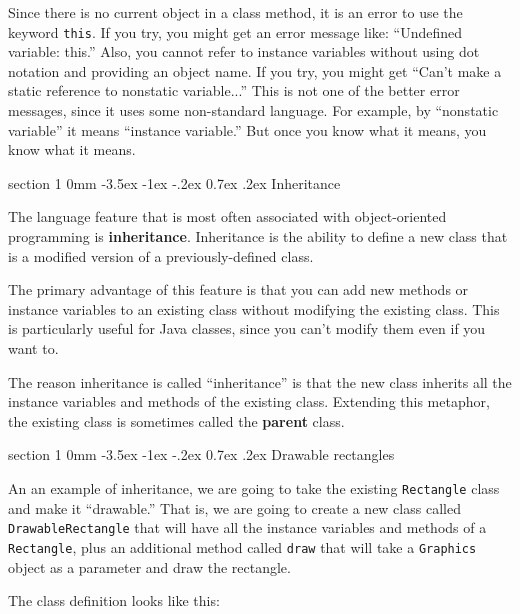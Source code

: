 \documentclass{book}
\makeatletter
\renewcommand{\section}{\@startsection 
    {section} {1} {0mm}%
    {-3.5ex \@plus -1ex \@minus -.2ex}%
    {0.7ex \@plus.2ex}%
    {\normalfont\Large\bfseries}}
\makeatother
\begin{document}

Since there is no current object in a class method, it is an
error to use the keyword {\tt this}.  If you try, you might get
an error message like: ``Undefined variable: this.''  Also, you
cannot refer to instance variables without using dot notation
and providing an object name.  If you try, you might get 
``Can't make a static reference to nonstatic variable...''
This is not one of the better error messages, since it uses
some non-standard language.  For example, by ``nonstatic
variable'' it means ``instance variable.''  But once you know
what it means, you know what it means.


\section{Inheritance}

The language feature that is most often associated with
object-oriented programming is {\bf inheritance}.  Inheritance is the
ability to define a new class that is a modified version of a
previously-defined class.

The primary advantage of this feature is that you can add new methods
or instance variables to an existing class without modifying the
existing class.  This is particularly useful for Java classes,
since you can't modify them even if you want to.

The reason inheritance is called ``inheritance'' is that the
new class inherits all the instance variables and methods
of the existing class.  Extending this metaphor, the existing
class is sometimes called the {\bf parent} class.


\section{Drawable rectangles}

An an example of inheritance, we are going to take the existing
{\tt Rectangle} class and make it ``drawable.''  That is, we are going to
create a new class called {\tt DrawableRectangle} that will have all
the instance variables and methods of a {\tt Rectangle}, plus an
additional method called {\tt draw} that will take a {\tt Graphics}
object as a parameter and draw the rectangle.

The class definition looks like this:
\end{document}
